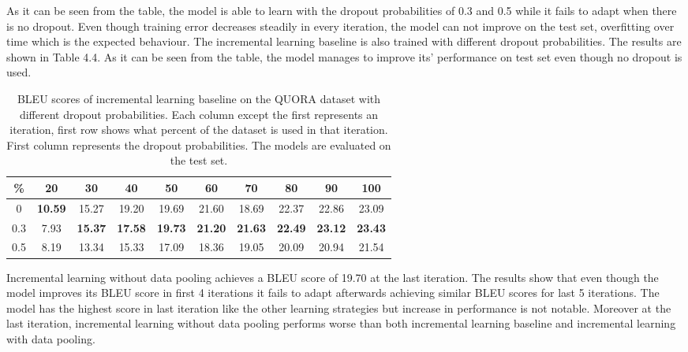 As it can be seen from the table, the model is able to learn with the dropout probabilities of 0.3 and 0.5 while it fails to adapt when there is no dropout. Even though training error decreases steadily in every iteration, the model can not improve on the test set, overfitting over time which is the expected behaviour. The incremental learning baseline is also trained with different dropout probabilities. The results are shown in Table 4.4. As it can be seen from the table, the model manages to improve its' performance on test set even though no dropout is used.

\begin{table}[t]
\centering
\small
 \begin{tabular}{|c | c | c | c | c | c | c | c | c | c |} 
 \hline
 \% & 20 & 30 & 40 & 50 & 60 & 70 & 80 & 90 & 100 \\ [0.5ex] 
 \hline
  0 & \textbf{10.59} & 15.27 & 19.20 & 19.69 & 21.60 & 18.69 & 22.37 & 22.86 & 23.09  \\ 
 \hline
  0.3 & 7.93 & \textbf{15.37} & \textbf{17.58} & \textbf{19.73} & \textbf{21.20} & \textbf{21.63} & \textbf{22.49} & \textbf{23.12} & \textbf{23.43} \\ 
 \hline
  0.5 & 8.19 & 13.34 & 15.33 & 17.09 & 18.36 & 19.05 & 20.09 & 20.94 & 21.54 \\ 
 \hline
\end{tabular}
\caption{BLEU scores of incremental learning baseline on the QUORA dataset with different dropout probabilities. Each column except the first represents an iteration, first row shows what percent of the dataset is used in that iteration. First column represents the dropout probabilities. The models are evaluated on the test set.}
\end{table}

Incremental learning without data pooling achieves a BLEU score of 19.70 at the last iteration. The results show that even though the model improves its BLEU score in first 4 iterations it fails to adapt afterwards achieving similar BLEU scores for last 5 iterations. The model has the highest score in last iteration like the other learning strategies but increase in performance is not notable. Moreover at the last iteration, incremental learning without data pooling performs worse than both incremental learning baseline and incremental learning with data pooling.

